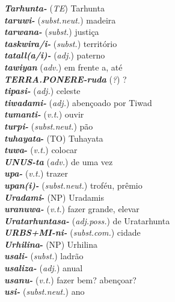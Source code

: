 \begin{multicols}{2}
\begin{hangparas}{1em}{1}
		\textbf{\emph{Tarhunta-}} (\emph{TE}) \tabto{1em} Tarhunta\\
		\textbf{\emph{taruwi-}} (\emph{subst.neut.}) \tabto{1em} madeira\\
		\textbf{\emph{tarwana-}} (\emph{subst.}) \tabto{1em} justiça\\
		\textbf{\emph{taskwira/i-}} (\emph{subst.}) \tabto{1em} território\\
		\textbf{\emph{tatall{(a/i)}-}} (\emph{adj.}) \tabto{1em} paterno\\
		\textbf{\emph{tawiyan}} (\emph{adv.}) \tabto{1em} em frente a, até\\
		\textbf{\emph{\emph{TERRA.PONERE}-ruda}} (\emph{?}) \tabto{1em} {?}\\
		\textbf{\emph{tipasi-}} (\emph{adj.}) \tabto{1em} celeste\\
		\textbf{\emph{tiwadami-}} (\emph{adj.}) \tabto{1em} abençoado por Tiwad\\
		\textbf{\emph{tumanti-}} (\emph{v.t.}) \tabto{1em} ouvir\\
		\textbf{\emph{turpi-}} (\emph{subst.neut.}) \tabto{1em} pão\\
		\textbf{\emph{tuhayata}-} (TO) \tabto{1em} Tuhayata\\
		\textbf{\emph{tuwa}-} (\emph{v.t.}) \tabto{1em} colocar\\
		\textbf{\emph{\emph{UNUS}-ta}} (\emph{adv.}) \tabto{1em} de uma vez\\
		\textbf{\emph{upa-}} (\emph{v.t.}) \tabto{1em} trazer\\
		\textbf{\emph{upan{(i)}-}} (\emph{subst.neut.}) \tabto{1em} troféu, prêmio\\
		\textbf{\emph{Uradami}-} (NP) \tabto{1em} Uradamis\\
		\textbf{\emph{uranuwa-}} (\emph{v.t.}) \tabto{1em} fazer grande, elevar\\
		\textbf{\emph{Uratarhuntasa-}} (\emph{adj.poss.}) \tabto{1em} de Uratarhunta\\
		\textbf{\emph{\emph{URBS+}MI-ni-}} (\emph{subst.com.}) \tabto{1em} cidade\\
		\textbf{\emph{Urhilina}-} (NP) \tabto{1em} Urhilina\\
		\textbf{\emph{usali-}} (\emph{subst.}) \tabto{1em} ladrão\\
		\textbf{\emph{usaliza-}} (\emph{adj.}) \tabto{1em} anual\\
		\textbf{\emph{usanu-}} (\emph{v.t.}) \tabto{1em} fazer bem? abençoar?\\
		\textbf{\emph{usi-}} (\emph{subst.neut.}) \tabto{1em} ano\\

\end{hangparas}
\end{multicols}
